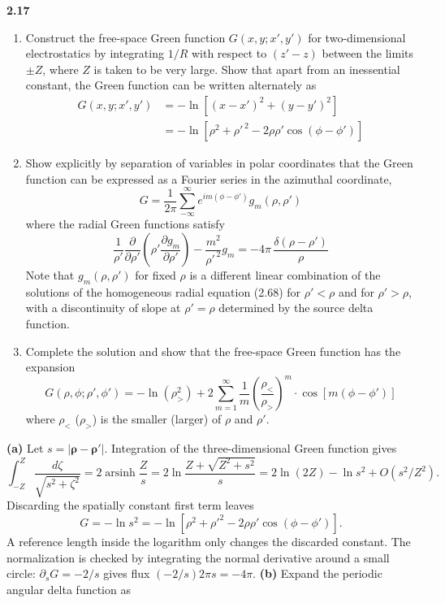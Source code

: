 \par\bigskip
\noindent\textbf{2.17}\quad\begin{enumerate}
\item[(a)] Construct the free-space Green function $G(x,y;x',y')$ for two-dimensional electrostatics by integrating $1/R$ with respect to $(z'-z)$ between the limits $\pm Z$, where $Z$ is taken to be very large. Show that apart from an inessential constant, the Green function can be written alternately as
\begin{align*}
G(x,y;x',y')&=-\ln[(x-x')^{2}+(y-y')^{2}]\\
&=-\ln[\rho^{2}+\rho'^{\,2}-2\rho\rho'\cos(\phi-\phi')]
\end{align*}
\item[(b)] Show explicitly by separation of variables in polar coordinates that the Green function can be expressed as a Fourier series in the azimuthal coordinate,
\[
G=\frac{1}{2\pi}\sum_{-\infty}^{\infty}e^{im(\phi-\phi')}g_{m}(\rho,\rho')
\]
where the radial Green functions satisfy
\[
\frac{1}{\rho'}\frac{\partial}{\partial\rho'}\!\left(\rho'\frac{\partial g_{m}}{\partial\rho'}\right)-\frac{m^{2}}{\rho'^{\,2}}g_{m}=-4\pi\,\frac{\delta(\rho-\rho')}{\rho}
\]
Note that $g_{m}(\rho,\rho')$ for fixed $\rho$ is a different linear combination of the solutions of the homogeneous radial equation (2.68) for $\rho'<\rho$ and for $\rho'>\rho$, with a discontinuity of slope at $\rho'=\rho$ determined by the source delta function.
\item[(c)] Complete the solution and show that the free-space Green function has the expansion
\[
G(\rho,\phi;\rho',\phi')=-\ln(\rho_{>}^{2})+2\sum_{m=1}^{\infty}\frac{1}{m}\left(\frac{\rho_{<}}{\rho_{>}}\right)^{m}\cdot\cos[m(\phi-\phi')]
\]
where $\rho_{<}$ ($\rho_{>}$) is the smaller (larger) of $\rho$ and $\rho'$.
\end{enumerate}
\solution
\textbf{(a)} Let $s=|\boldsymbol\rho-\boldsymbol\rho'|$. Integration
of the three-dimensional Green function gives
\[
\int_{-Z}^{Z}\frac{d\zeta}{\sqrt{s^2+\zeta^2}}
=2\operatorname{arsinh}\frac Zs
=2\ln\frac{Z+\sqrt{Z^2+s^2}}s
=2\ln(2Z)-\ln s^2+O(s^2/Z^2).
\]
Discarding the spatially constant first term leaves
\[
\boxed{G=-\ln s^2
=-\ln[\rho^2+\rho'^2-2\rho\rho'\cos(\phi-\phi')].}
\]
A reference length inside the logarithm only changes the discarded
constant. The normalization is checked by integrating the normal
derivative around a small circle: $\partial_sG=-2/s$ gives flux
$(-2/s)2\pi s=-4\pi$.
\textbf{(b)} Expand the periodic angular delta function as
